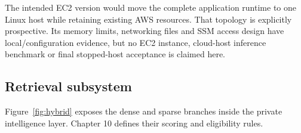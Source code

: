 The intended EC2 version would move the complete application runtime to one Linux host while retaining existing AWS resources. That topology is explicitly prospective. Its memory limits, networking files and SSM access design have local/configuration evidence, but no EC2 instance, cloud-host inference benchmark or final stopped-host acceptance is claimed here.
\subsection{Retrieval subsystem}
Figure~\ref{fig:hybrid} exposes the dense and sparse branches inside the private intelligence layer. Chapter 10 defines their scoring and eligibility rules.
\FloatBarrier
